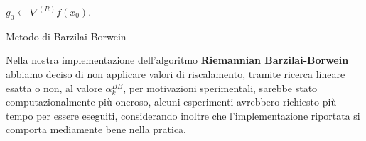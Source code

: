 \documentclass[a4paper, 12pt]{article}
\begin{document}
\begin{center}
\begin{algorithm}[H]
\SetAlgoLined
{}
$g_0 \leftarrow \nabla^{(R)} f(x_0)$.\\
\caption{Metodo di Barzilai-Borwein}
\end{algorithm}
\end{center}
Nella nostra implementazione dell'algoritmo \textbf{Riemannian Barzilai-Borwein} abbiamo deciso di non applicare valori di riscalamento, tramite ricerca lineare esatta o non, al valore $\alpha_k^{BB}$, per motivazioni sperimentali, sarebbe stato computazionalmente più oneroso, alcuni esperimenti avrebbero richiesto più tempo per essere eseguiti, considerando inoltre che l'implementazione riportata si comporta mediamente bene nella pratica.
\end{document}

